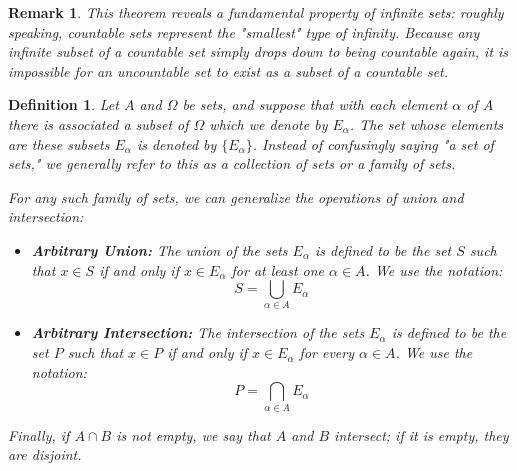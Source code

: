 \documentclass{article}
\theoremstyle{mythm}
\newtheorem{definition}[theorem]{Definition}
\newtheorem{remark}[theorem]{Remark}
\begin{document}
\begin{remark}
This theorem reveals a fundamental property of infinite sets: roughly speaking, countable sets represent the "smallest" type of infinity. Because any infinite subset of a countable set simply drops down to being countable again, it is impossible for an uncountable set to exist as a subset of a countable set.
\end{remark}
\begin{definition}
Let $A$ and $\Omega$ be sets, and suppose that with each element $\alpha$ of $A$ there is associated a subset of $\Omega$ which we denote by $E_\alpha$. The set whose elements are these subsets $E_\alpha$ is denoted by $\{E_\alpha\}$. Instead of confusingly saying "a set of sets," we generally refer to this as a \textit{collection of sets} or a \textit{family of sets}.

For any such family of sets, we can generalize the operations of union and intersection:
\begin{itemize}
    \item \textbf{Arbitrary Union:} The union of the sets $E_\alpha$ is defined to be the set $S$ such that $x \in S$ if and only if $x \in E_\alpha$ for \textit{at least one} $\alpha \in A$. We use the notation:
    \[ S = \bigcup_{\alpha \in A} E_\alpha \]
    \item \textbf{Arbitrary Intersection:} The intersection of the sets $E_\alpha$ is defined to be the set $P$ such that $x \in P$ if and only if $x \in E_\alpha$ for \textit{every} $\alpha \in A$. We use the notation:
    \[ P = \bigcap_{\alpha \in A} E_\alpha \]
\end{itemize}

Finally, if $A \cap B$ is not empty, we say that $A$ and $B$ \textit{intersect}; if it is empty, they are \textit{disjoint}.
\end{definition}
\end{document}
